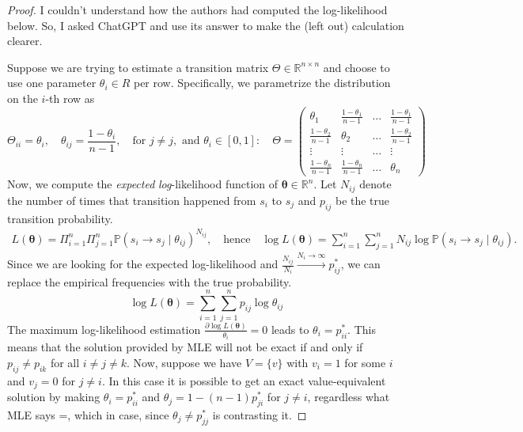 \documentclass[a4paper]{article}
\theoremstyle{definition}
\theoremstyle{remark}
\theoremstyle{plain}
\newcommand{\R}{\mathbb{R}}
\renewcommand{\P}{\mathbb{P}}
\begin{document}
\begin{proof}
    I couldn't understand how the authors had computed the log-likelihood below. So, I asked ChatGPT and use its answer to make the (left out) calculation clearer. 
    
    Suppose we are trying to estimate a transition matrix $\Theta \in \R^{n \times n}$ and choose to use one parameter $\theta_i \in R$ per row. Specifically, we parametrize the distribution on the $i$-th row as
    \begin{equation*}
        \Theta_{ii} = \theta_i, \quad \theta_{ij} = \frac{1 - \theta_i}{n - 1}, \quad \text{for } j \neq j, \text{ and } \theta_i \in [0, 1]: \quad
        \Theta = \begin{pmatrix}
            \theta_1 & \frac{1 - \theta_1}{n - 1} & \dots & \frac{1 - \theta_1}{n - 1} \\
            \frac{1 - \theta_2}{n - 1} & \theta_2 & \dots & \frac{1 - \theta_2}{n - 1} \\
            \vdots & \vdots & \dots & \vdots \\
             \frac{1 - \theta_n}{n - 1} & \frac{1 - \theta_n}{n - 1} & \dots & \theta_n
        \end{pmatrix}
    \end{equation*}
    Now, we compute the \emph{expected} \emph{log}-likelihood function of $\bm{\theta} \in \R^n$. Let $N_{ij}$ denote the number of times that transition happened from $s_i$ to $s_j$ and $p_{ij}$ be the true transition probability.
    \begin{align*}
        L(\bm{\theta}) = \Pi_{i = 1}^{n}\Pi_{j = 1}^{n} \P(s_i \to s_j \mid \theta_{ij})^{N_{ij}}, \quad \text{hence} \quad \log L(\bm{\theta}) = \sum_{i = 1}^n\sum_{j = 1}^n N_{ij} \log \P(s_i \to s_j \mid \theta_{ij}).
    \end{align*}
    Since we are looking for the expected log-likelihood and $\frac{N_{ij}}{N_i} \xrightarrow{N_i \to \infty} p^*_{ij}$, we can replace the empirical frequencies with the true probability.
    \begin{equation*}
        \log L(\bm{\theta}) = \sum_{i = 1}^n\sum_{j = 1}^n p_{ij} \log \theta_{ij}
    \end{equation*}
    The maximum log-likelihood estimation $\frac{\partial\log L(\bm{\theta})}{\theta_i} = 0$ leads to $\theta_i = p^*_{ii}$. This means that the solution provided by MLE will not be exact if and only if $p_{ij} \neq p_{ik}$ for all $i \neq j \neq k$. Now, suppose we have $V = \{v\}$ with $v_i = 1$ for some $i$ and $v_j = 0$ for $j \neq i$. In this case it is possible to get an exact value-equivalent solution by making $\theta_i = p^*_{ii}$ and $\theta_j = 1 - (n -1) p^*_{ji}$ for $j \neq i$, regardless what MLE says =, which in case, since $\theta_j \neq p^*_{jj}$ is contrasting it.
\end{proof}
\end{document}
